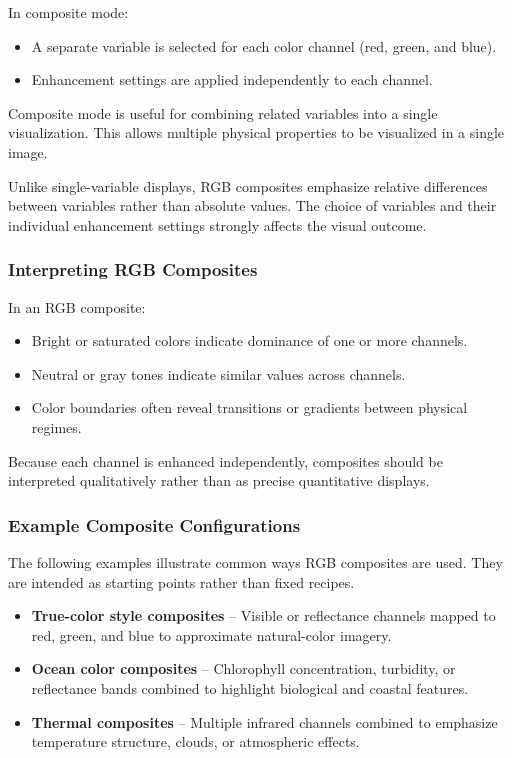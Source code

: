 In composite mode:
\begin{itemize}
  \item A separate variable is selected for each color channel
        (red, green, and blue).
  \item Enhancement settings are applied independently to each channel.
\end{itemize}

Composite mode is useful for combining related variables into a single
visualization.  This allows multiple
physical properties to be visualized in a single image.

Unlike single-variable displays, RGB composites emphasize relative
differences between variables rather than absolute values. The choice
of variables and their individual enhancement settings strongly affects
the visual outcome.

\subsubsection*{Interpreting RGB Composites}

In an RGB composite:
\begin{itemize}
  \item Bright or saturated colors indicate dominance of one or more
        channels.
  \item Neutral or gray tones indicate similar values across channels.
  \item Color boundaries often reveal transitions or gradients between
        physical regimes.
\end{itemize}

Because each channel is enhanced independently, composites should be
interpreted qualitatively rather than as precise quantitative displays.

\subsubsection*{Example Composite Configurations}

The following examples illustrate common ways RGB composites are used.
They are intended as starting points rather than fixed recipes.
\begin{itemize}
  \item \textbf{True-color style composites} --
        Visible or reflectance channels mapped to red, green, and blue
        to approximate natural-color imagery.
  \item \textbf{Ocean color composites} --
        Chlorophyll concentration, turbidity, or reflectance bands
        combined to highlight biological and coastal features.
  \item \textbf{Thermal composites} --
        Multiple infrared channels combined to emphasize temperature
        structure, clouds, or atmospheric effects.
\end{itemize}

